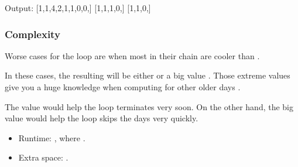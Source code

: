 \documentclass[letterpaper,12pt,english]{book}
\begin{document}
\begin{sphinxVerbatim}[commandchars=\\\{\}]
\end{sphinxVerbatim}

\begin{sphinxVerbatim}[commandchars=\\\{\}]
Output:
[1,1,4,2,1,1,0,0,]
[1,1,1,0,]
[1,1,0,]
\end{sphinxVerbatim}


\subsubsection{Complexity}
\label{\detokenize{Array/01_ARR_739_Daily_Temperatures:id4}}
\sphinxAtStartPar
Worse cases for the  loop are when most  in their chain are cooler than .

\sphinxAtStartPar
In these cases, the resulting  will be either  or a big value . Those extreme values give you a huge knowledge when computing  for other older days .

\sphinxAtStartPar
The value  would help the  loop terminates very soon. On the other hand, the big value  would help the  loop skips the days  very quickly.
\begin{itemize}
\item {} 
\sphinxAtStartPar
Runtime: , where .

\item {} 
\sphinxAtStartPar
Extra space: .

\end{itemize}
\end{document}
